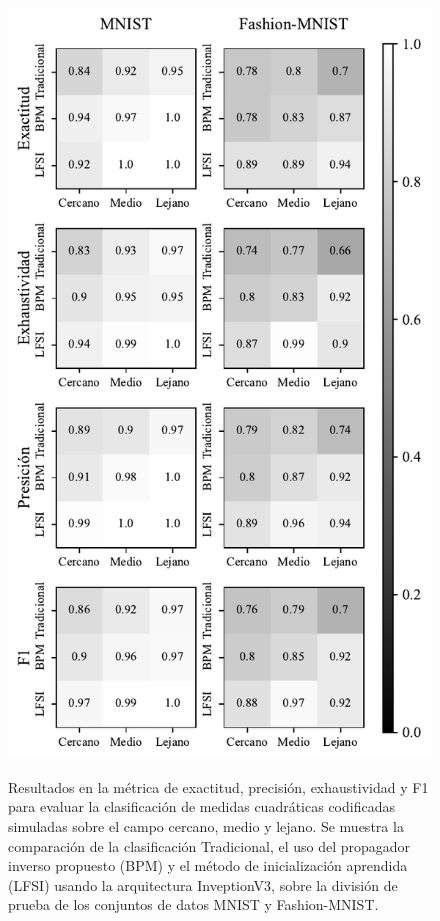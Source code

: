 \begin{figure}[!h]
    \centering
    \caption{Resultados en la métrica de exactitud, precisión, exhaustividad y F1 para evaluar la clasificación de medidas cuadráticas codificadas simuladas sobre el campo cercano, medio y lejano. Se muestra la comparación de la clasificación Tradicional, el uso del propagador inverso propuesto (BPM) y el método de inicialización aprendida (LFSI) usando la arquitectura InveptionV3, sobre la división de prueba de los conjuntos de datos MNIST y Fashion-MNIST.}
    \includegraphics[height=0.8\textheight]{images/resultados/test_result_inception.pdf}
    \label{fig:results_inc}
\end{figure}

